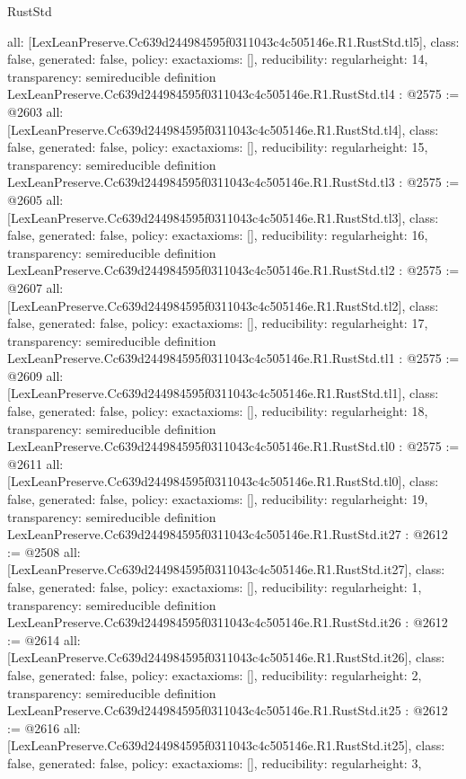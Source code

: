 \begin{lexlean}{RustStd}
\begin{coremodule}
{  all: [LexLeanPreserve.Cc639d244984595f0311043c4c505146e.R1.RustStd.tl5],
  class: false,
  generated: false,
  policy: exact{axioms: []},
  reducibility: regular{height: 14},
  transparency: semireducible
}
definition LexLeanPreserve.Cc639d244984595f0311043c4c505146e.R1.RustStd.tl4 : @2575 := @2603 {
  all: [LexLeanPreserve.Cc639d244984595f0311043c4c505146e.R1.RustStd.tl4],
  class: false,
  generated: false,
  policy: exact{axioms: []},
  reducibility: regular{height: 15},
  transparency: semireducible
}
definition LexLeanPreserve.Cc639d244984595f0311043c4c505146e.R1.RustStd.tl3 : @2575 := @2605 {
  all: [LexLeanPreserve.Cc639d244984595f0311043c4c505146e.R1.RustStd.tl3],
  class: false,
  generated: false,
  policy: exact{axioms: []},
  reducibility: regular{height: 16},
  transparency: semireducible
}
definition LexLeanPreserve.Cc639d244984595f0311043c4c505146e.R1.RustStd.tl2 : @2575 := @2607 {
  all: [LexLeanPreserve.Cc639d244984595f0311043c4c505146e.R1.RustStd.tl2],
  class: false,
  generated: false,
  policy: exact{axioms: []},
  reducibility: regular{height: 17},
  transparency: semireducible
}
definition LexLeanPreserve.Cc639d244984595f0311043c4c505146e.R1.RustStd.tl1 : @2575 := @2609 {
  all: [LexLeanPreserve.Cc639d244984595f0311043c4c505146e.R1.RustStd.tl1],
  class: false,
  generated: false,
  policy: exact{axioms: []},
  reducibility: regular{height: 18},
  transparency: semireducible
}
definition LexLeanPreserve.Cc639d244984595f0311043c4c505146e.R1.RustStd.tl0 : @2575 := @2611 {
  all: [LexLeanPreserve.Cc639d244984595f0311043c4c505146e.R1.RustStd.tl0],
  class: false,
  generated: false,
  policy: exact{axioms: []},
  reducibility: regular{height: 19},
  transparency: semireducible
}
definition LexLeanPreserve.Cc639d244984595f0311043c4c505146e.R1.RustStd.it27 : @2612 := @2508 {
  all: [LexLeanPreserve.Cc639d244984595f0311043c4c505146e.R1.RustStd.it27],
  class: false,
  generated: false,
  policy: exact{axioms: []},
  reducibility: regular{height: 1},
  transparency: semireducible
}
definition LexLeanPreserve.Cc639d244984595f0311043c4c505146e.R1.RustStd.it26 : @2612 := @2614 {
  all: [LexLeanPreserve.Cc639d244984595f0311043c4c505146e.R1.RustStd.it26],
  class: false,
  generated: false,
  policy: exact{axioms: []},
  reducibility: regular{height: 2},
  transparency: semireducible
}
definition LexLeanPreserve.Cc639d244984595f0311043c4c505146e.R1.RustStd.it25 : @2612 := @2616 {
  all: [LexLeanPreserve.Cc639d244984595f0311043c4c505146e.R1.RustStd.it25],
  class: false,
  generated: false,
  policy: exact{axioms: []},
  reducibility: regular{height: 3},
}
\end{coremodule}
\end{lexlean}
